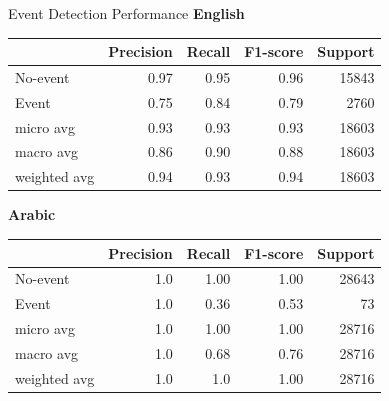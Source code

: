 \begin{frame}{Event Detection Performance}
\textbf{English}
\begin{table}
\small
    \centering
   \begin{tabular}{lrrrr}
\toprule
{} &  Precision &  Recall &    F1-score &  Support \\
\midrule
No-event            &  0.97 &   0.95 &  0.96 &   15843 \\
Event               &  0.75 &   0.84 &  0.79 &   2760 \\
micro avg           &  0.93 &   0.93 &  0.93 &   18603 \\
macro avg           &  0.86 &   0.90 &  0.88 &   18603 \\
weighted avg        &  0.94 &   0.93 &  0.94 &   18603 \\
\bottomrule
\end{tabular}
    \label{tab:engDetection}
\end{table}

\textbf{Arabic}
\begin{table}
\small
    \centering
   \begin{tabular}{lrrrr}
\toprule
{} &  Precision &  Recall &    F1-score &  Support \\
\midrule
No-event            &  1.0 &  1.00 &  1.00 &  28643 \\
Event               &  1.0 &  0.36 &  0.53 &   73 \\
micro avg           &  1.0 &  1.00 &  1.00 &  28716 \\
macro avg           &  1.0 &  0.68 &  0.76 &  28716 \\
weighted avg        &  1.0 &  1.0  &  1.00 &  28716 \\
\bottomrule
\end{tabular}
    \label{tab:arDetection}
\end{table}
\end{frame}

